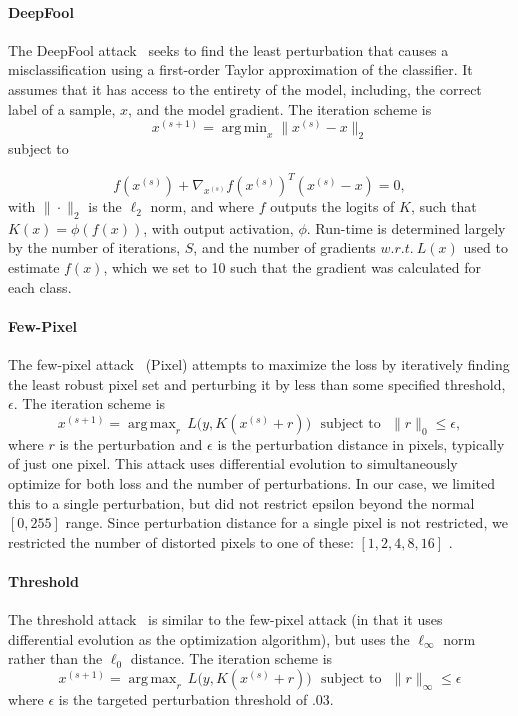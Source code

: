 \documentclass[lettersize,journal]{IEEEtran}
\DeclareMathOperator*{\argmin}{arg\,min}
\DeclareMathOperator*{\argmax}{arg\,max}
\begin{document}
\paragraph{DeepFool}

The DeepFool attack~\cite{deepfool} seeks to find the least perturbation that causes a misclassification using a first-order Taylor approximation of the classifier. It assumes that it has access to the entirety of the model, including, the correct label of a sample, $x$, and the model gradient. The iteration scheme is
$$
    x^{(s+1)} = \argmin_x \|x^{(s)} - x\|_2 
$$
subject to 

$$
f(x^{(s)}) + \nabla_{x^{(s)}} f(x^{(s)})^T(x^{(s)} - x) = 0,
$$
with $\|\cdot\|_2$ is the $\ell_2$ norm, and where $f$ outputs the logits of $K$, such that $K(x) = \phi(f(x))$, with output activation, $\phi$. Run-time is determined largely by the number of iterations, $S$, and the number of gradients $w.r.t.~L(x)$ used to estimate $f(x)$, which we set to 10 such that the gradient was calculated for each class.





\paragraph{Few-Pixel}

The few-pixel attack~\cite{pixelattack} (Pixel) attempts to maximize the loss by iteratively finding the least robust pixel set and perturbing it by less than some specified threshold, $\epsilon$. The iteration scheme is
$$
    x^{(s+1)} = \argmax_r \, L\big(y, K(x^{(s)} + r)\big) \text{~~subject~to~~}  \|r\|_0 \leq \epsilon,
$$
where $r$ is the perturbation and $\epsilon$ is the perturbation distance in pixels, typically of just one pixel. This attack uses differential evolution to simultaneously optimize for both loss and the number of perturbations. In our case, we limited this to a single perturbation, but did not restrict epsilon beyond the normal $[0, 255]$ range. Since perturbation distance for a single pixel is not restricted, we restricted the number of distorted pixels to one of these: $[1,2,4,8, 16]$ . 



\paragraph{Threshold}
The threshold attack~\cite{pixelattack} is similar to the few-pixel attack (in that it uses differential evolution as the optimization algorithm), but uses the $\ell_{\infty}$ norm rather than the $\ell_0$ distance. The iteration scheme is
$$
    x^{(s+1)} = \argmax_r \, L\big(y, K(x^{(s)} + r)\big) \text{~~subject~to~~}  \|r\|_{\infty} \leq \epsilon
$$
where $\epsilon$ is the targeted perturbation threshold of .03. 
\end{document}
